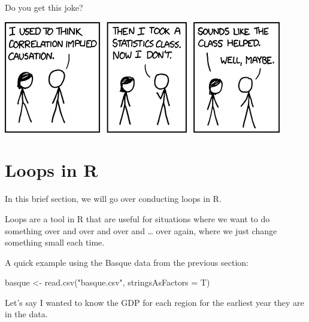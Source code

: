\documentclass[
  letterpaper,
  DIV=11,
  numbers=noendperiod]{scrreprt}
\newenvironment{Shaded}{\begin{snugshade}}{\end{snugshade}}
\newcommand{\AttributeTok}[1]{\textcolor[rgb]{0.40,0.45,0.13}{#1}}
\newcommand{\FunctionTok}[1]{\textcolor[rgb]{0.28,0.35,0.67}{#1}}
\newcommand{\NormalTok}[1]{\textcolor[rgb]{0.00,0.23,0.31}{#1}}
\newcommand{\OtherTok}[1]{\textcolor[rgb]{0.00,0.23,0.31}{#1}}
\newcommand{\SpecialCharTok}[1]{\textcolor[rgb]{0.37,0.37,0.37}{#1}}
\newcommand{\StringTok}[1]{\textcolor[rgb]{0.13,0.47,0.30}{#1}}
\begin{document}
Do you get this joke?

\includegraphics{images/causality-cartoon.png}


\hypertarget{loops}{%
\chapter{Loops in R}\label{loops}}

In this brief section, we will go over conducting loops in R.

Loops are a tool in R that are useful for situations where we want to do
something over and over and over and \ldots{} over again, where we just
change something small each time.

A quick example using the Basque data from the previous section:

\begin{Shaded}
\begin{Highlighting}[]
\NormalTok{basque }\OtherTok{\textless{}{-}} \FunctionTok{read.csv}\NormalTok{(}\StringTok{"basque.csv"}\NormalTok{, }\AttributeTok{stringsAsFactors =}\NormalTok{ T)}
\end{Highlighting}
\end{Shaded}

Let's say I wanted to know the GDP for each region for the earliest year
they are in the data.

\begin{Shaded}
\end{Shaded}
\end{document}

